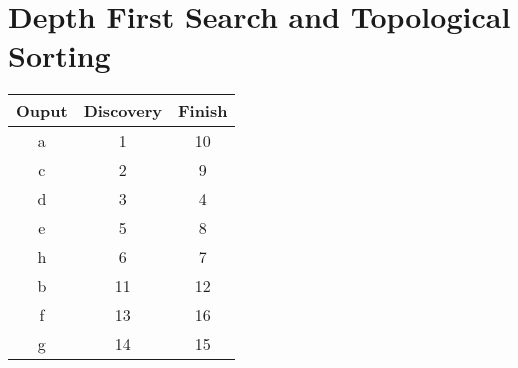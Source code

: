 \documentclass{article}
\begin{document}
\section{Depth First Search and Topological Sorting}
\begin{center}
\begin{tabular}{c|cc}
    \toprule
    \textbf{Ouput} & \textbf{Discovery} & \textbf{Finish} \\ \hline
    a & 1 & 10 \\
    c & 2 & 9\\
    d & 3 & 4\\
    e & 5 & 8\\
    h & 6 & 7\\
    b & 11 & 12\\
    f & 13 & 16\\
    g & 14 & 15\\
    \bottomrule
\end{tabular}
\end{center}
\end{document}
